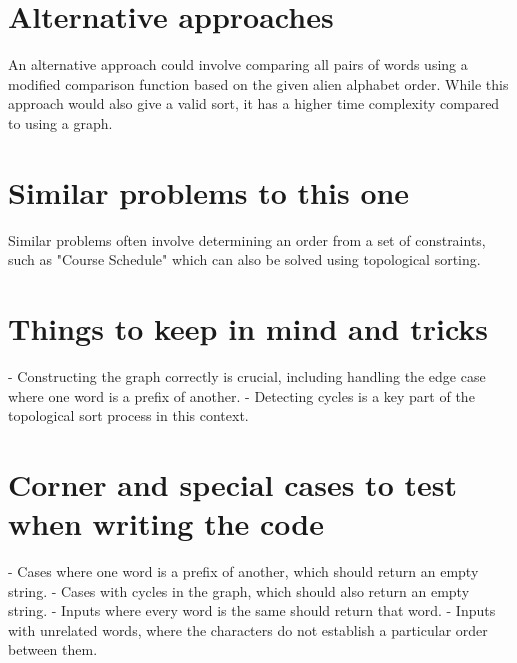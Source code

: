 \section*{Alternative approaches}
An alternative approach could involve comparing all pairs of words using a modified comparison function based on the given alien alphabet order. While this approach would also give a valid sort, it has a higher time complexity compared to using a graph.

\section*{Similar problems to this one}
Similar problems often involve determining an order from a set of constraints, such as "Course Schedule" which can also be solved using topological sorting.

\section*{Things to keep in mind and tricks}
- Constructing the graph correctly is crucial, including handling the edge case where one word is a prefix of another.
- Detecting cycles is a key part of the topological sort process in this context.

\section*{Corner and special cases to test when writing the code}
- Cases where one word is a prefix of another, which should return an empty string.
- Cases with cycles in the graph, which should also return an empty string.
- Inputs where every word is the same should return that word.
- Inputs with unrelated words, where the characters do not establish a particular order between them.